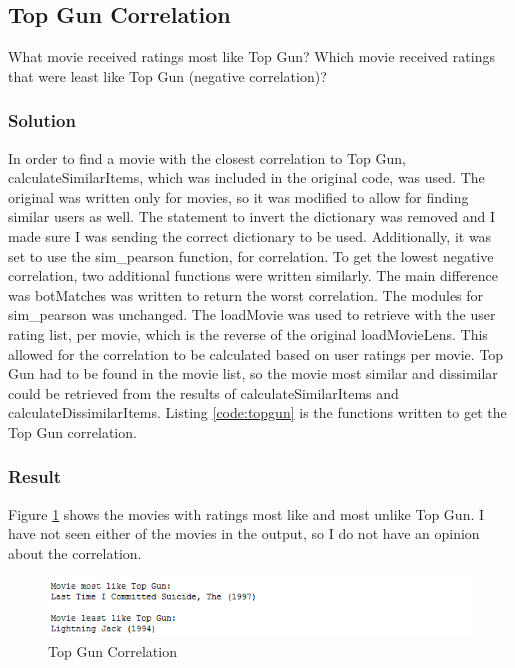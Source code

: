 \documentclass[paper=a4, fontsize=11pt]{scrartcl} %
\numberwithin{equation}{section} %
\numberwithin{figure}{section} %
\numberwithin{table}{section} %
\begin{document}

\subsection{Top Gun Correlation}
What movie received ratings most like Top Gun? 
Which movie received ratings that were least like Top Gun (negative correlation)?

\subsubsection{Solution}
In order to find a movie with the closest correlation to Top Gun, calculateSimilarItems, which was included in the original code, was used. 
The original was written only for movies, so it was modified to allow for finding similar users as well.
The statement to invert the dictionary was removed and I made sure I was sending the correct dictionary to be used.
Additionally, it was set to use the sim\_pearson function, for correlation.
To get the lowest negative correlation, two additional functions were written similarly.  
The main difference was botMatches was written to return the worst correlation.
The modules for sim\_pearson was unchanged.
The loadMovie was used to retrieve with the user rating list, per movie, which is the reverse of the original loadMovieLens.
This allowed for the correlation to be calculated based on user ratings per movie.\cite{bib:collective}
Top Gun had to be found in the movie list, so the movie most similar and dissimilar could be retrieved from the results of calculateSimilarItems and calculateDissimilarItems.
Listing \ref{code:topgun} is the functions written to get the Top Gun correlation.\\



\subsubsection{Result}
Figure \ref{fig:topgun} shows the movies with ratings most like and most unlike Top Gun.
I have not seen either of the movies in the output, so I do not have an opinion about the correlation.

\begin{figure}[H]
\includegraphics[width=1\textwidth]{pics/topGun}
\caption{Top Gun Correlation}
\label{fig:topgun}
\end{figure}
\end{document}
